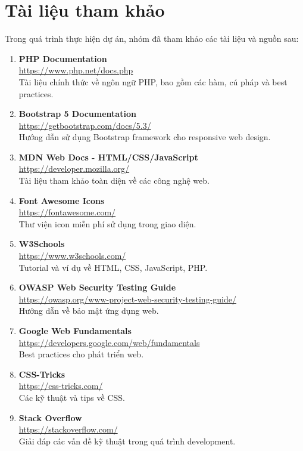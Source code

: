 
\section{Tài liệu tham khảo}

Trong quá trình thực hiện dự án, nhóm đã tham khảo các tài liệu và nguồn sau:


\begin{enumerate}
    \item \textbf{PHP Documentation}\\
    \url{https://www.php.net/docs.php}\\
    Tài liệu chính thức về ngôn ngữ PHP, bao gồm các hàm, cú pháp và best practices.
    
    \item \textbf{Bootstrap 5 Documentation}\\
    \url{https://getbootstrap.com/docs/5.3/}\\
    Hướng dẫn sử dụng Bootstrap framework cho responsive web design.
    
    \item \textbf{MDN Web Docs - HTML/CSS/JavaScript}\\
    \url{https://developer.mozilla.org/}\\
    Tài liệu tham khảo toàn diện về các công nghệ web.
    
    \item \textbf{Font Awesome Icons}\\
    \url{https://fontawesome.com/}\\
    Thư viện icon miễn phí sử dụng trong giao diện.
    
    \item \textbf{W3Schools}\\
    \url{https://www.w3schools.com/}\\
    Tutorial và ví dụ về HTML, CSS, JavaScript, PHP.
    
    \item \textbf{OWASP Web Security Testing Guide}\\
    \url{https://owasp.org/www-project-web-security-testing-guide/}\\
    Hướng dẫn về bảo mật ứng dụng web.
    
    \item \textbf{Google Web Fundamentals}\\
    \url{https://developers.google.com/web/fundamentals}\\
    Best practices cho phát triển web.
    
    \item \textbf{CSS-Tricks}\\
    \url{https://css-tricks.com/}\\
    Các kỹ thuật và tips về CSS.
    
    \item \textbf{Stack Overflow}\\
    \url{https://stackoverflow.com/}\\
    Giải đáp các vấn đề kỹ thuật trong quá trình development.
\end{enumerate}
